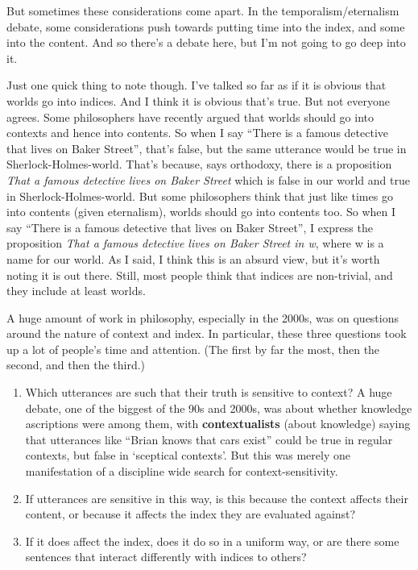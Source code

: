 \documentclass[
]{article}
\providecommand{\tightlist}{%
  \setlength{\itemsep}{0pt}\setlength{\parskip}{0pt}}
\begin{document}
But sometimes these considerations come apart. In the
temporalism/eternalism debate, some considerations push towards putting
time into the index, and some into the content. And so there's a debate
here, but I'm not going to go deep into it.

Just one quick thing to note though. I've talked so far as if it is
obvious that worlds go into indices. And I think it is obvious that's
true. But not everyone agrees. Some philosophers have recently argued
that worlds should go into contexts and hence into contents. So when I
say ``There is a famous detective that lives on Baker Street'', that's
false, but the same utterance would be true in Sherlock-Holmes-world.
That's because, says orthodoxy, there is a proposition \emph{That a
famous detective lives on Baker Street} which is false in our world and
true in Sherlock-Holmes-world. But some philosophers think that just
like times go into contents (given eternalism), worlds should go into
contents too. So when I say ``There is a famous detective that lives on
Baker Street'', I express the proposition \emph{That a famous detective
lives on Baker Street in w}, where w is a name for our world. As I said,
I think this is an absurd view, but it's worth noting it is out there.
Still, most people think that indices are non-trivial, and they include
at least worlds.

A huge amount of work in philosophy, especially in the 2000s, was on
questions around the nature of context and index. In particular, these
three questions took up a lot of people's time and attention. (The first
by far the most, then the second, and then the third.)

\begin{enumerate}
\def\labelenumi{\arabic{enumi}.}
\tightlist
\item
  Which utterances are such that their truth is sensitive to context? A
  huge debate, one of the biggest of the 90s and 2000s, was about
  whether knowledge ascriptions were among them, with
  \textbf{contextualists} (about knowledge) saying that utterances like
  ``Brian knows that cars exist'' could be true in regular contexts, but
  false in `sceptical contexts'. But this was merely one manifestation
  of a discipline wide search for context-sensitivity.
\item
  If utterances are sensitive in this way, is this because the context
  affects their content, or because it affects the index they are
  evaluated against?
\item
  If it does affect the index, does it do so in a uniform way, or are
  there some sentences that interact differently with indices to others?
\end{enumerate}
\end{document}
